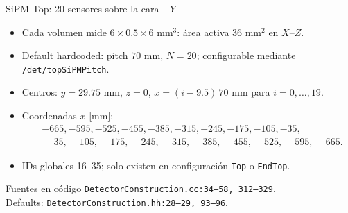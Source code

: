\documentclass[aspectratio=169]{beamer}
\begin{document}
\begin{frame}{SiPM Top: 20 sensores sobre la cara $+Y$}
  \small
  \begin{itemize}
    \item Cada volumen mide $6\times0.5\times6$ mm$^3$:
      área activa $36$ mm$^2$ en $X$--$Z$.
    \item Default hardcoded: pitch $70$ mm, $N=20$; configurable mediante
      \texttt{/det/topSiPMPitch}.
    \item Centros: $y=29.75$ mm, $z=0$,
      $x=(i-9.5)\,70$ mm para $i=0,\ldots,19$.
    \item Coordenadas $x$ [mm]:
      \[
      \begin{aligned}
      &-665,-595,-525,-455,-385,-315,-245,-175,-105,-35,\\
      &\phantom{-}35,\phantom{-}105,\phantom{-}175,\phantom{-}245,
       \phantom{-}315,\phantom{-}385,\phantom{-}455,\phantom{-}525,
       \phantom{-}595,\phantom{-}665.
      \end{aligned}
      \]
    \item IDs globales 16--35; solo existen en configuración \texttt{Top} o
      \texttt{EndTop}.
  \end{itemize}
  \begin{alertblock}{Fuentes en código}
    \scriptsize
    \texttt{DetectorConstruction.cc:34--58, 312--329}.\\
    Defaults: \texttt{DetectorConstruction.hh:28--29, 93--96}.
  \end{alertblock}
\end{frame}
\end{document}
